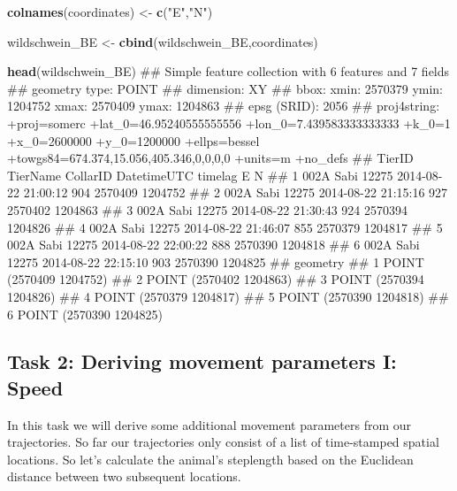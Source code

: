 \documentclass[]{book}
\newenvironment{Shaded}{\begin{snugshade}}{\end{snugshade}}
\newcommand{\KeywordTok}[1]{\textcolor[rgb]{0.13,0.29,0.53}{\textbf{#1}}}
\newcommand{\StringTok}[1]{\textcolor[rgb]{0.31,0.60,0.02}{#1}}
\newcommand{\NormalTok}[1]{#1}
\begin{document}
\begin{Shaded}
\begin{Highlighting}[]
\KeywordTok{colnames}\NormalTok{(coordinates) <-}\StringTok{ }\KeywordTok{c}\NormalTok{(}\StringTok{"E"}\NormalTok{,}\StringTok{"N"}\NormalTok{)}

\NormalTok{wildschwein_BE <-}\StringTok{ }\KeywordTok{cbind}\NormalTok{(wildschwein_BE,coordinates)}

\KeywordTok{head}\NormalTok{(wildschwein_BE)}
\NormalTok{## Simple feature collection with 6 features and 7 fields}
\NormalTok{## geometry type:  POINT}
\NormalTok{## dimension:      XY}
\NormalTok{## bbox:           xmin: 2570379 ymin: 1204752 xmax: 2570409 ymax: 1204863}
\NormalTok{## epsg (SRID):    2056}
\NormalTok{## proj4string:    +proj=somerc +lat_0=46.95240555555556 +lon_0=7.439583333333333 +k_0=1 +x_0=2600000 +y_0=1200000 +ellps=bessel +towgs84=674.374,15.056,405.346,0,0,0,0 +units=m +no_defs}
\NormalTok{##   TierID TierName CollarID         DatetimeUTC timelag       E       N}
\NormalTok{## 1   002A     Sabi    12275 2014-08-22 21:00:12     904 2570409 1204752}
\NormalTok{## 2   002A     Sabi    12275 2014-08-22 21:15:16     927 2570402 1204863}
\NormalTok{## 3   002A     Sabi    12275 2014-08-22 21:30:43     924 2570394 1204826}
\NormalTok{## 4   002A     Sabi    12275 2014-08-22 21:46:07     855 2570379 1204817}
\NormalTok{## 5   002A     Sabi    12275 2014-08-22 22:00:22     888 2570390 1204818}
\NormalTok{## 6   002A     Sabi    12275 2014-08-22 22:15:10     903 2570390 1204825}
\NormalTok{##                  geometry}
\NormalTok{## 1 POINT (2570409 1204752)}
\NormalTok{## 2 POINT (2570402 1204863)}
\NormalTok{## 3 POINT (2570394 1204826)}
\NormalTok{## 4 POINT (2570379 1204817)}
\NormalTok{## 5 POINT (2570390 1204818)}
\NormalTok{## 6 POINT (2570390 1204825)}
\end{Highlighting}
\end{Shaded}

\subsection{Task 2: Deriving movement parameters I:
Speed}\label{task-2-deriving-movement-parameters-i-speed}

In this task we will derive some additional movement parameters from our
trajectories. So far our trajectories only consist of a list of
time-stamped spatial locations. So let's calculate the animal's
steplength based on the Euclidean distance between two subsequent
locations.
\end{document}
